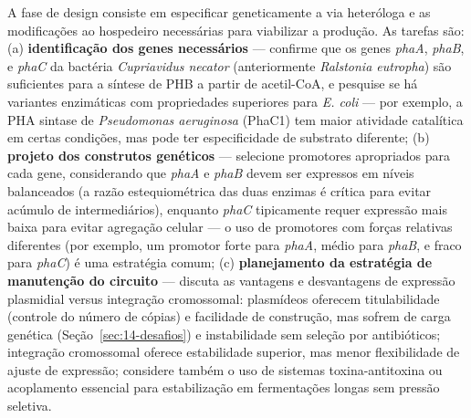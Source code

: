 \begin{exercicio}
A fase de design consiste em especificar geneticamente a via heteróloga e as modificações ao hospedeiro necessárias para viabilizar a produção. As tarefas são: (a) \textbf{identificação dos genes necessários} --- confirme que os genes \textit{phaA}, \textit{phaB}, e \textit{phaC} da bactéria \textit{Cupriavidus necator} (anteriormente \textit{Ralstonia eutropha}) são suficientes para a síntese de PHB a partir de acetil-CoA, e pesquise se há variantes enzimáticas com propriedades superiores para \textit{E. coli} --- por exemplo, a PHA sintase de \textit{Pseudomonas aeruginosa} (PhaC1) tem maior atividade catalítica em certas condições, mas pode ter especificidade de substrato diferente; (b) \textbf{projeto dos construtos genéticos} --- selecione promotores apropriados para cada gene, considerando que \textit{phaA} e \textit{phaB} devem ser expressos em níveis balanceados (a razão estequiométrica das duas enzimas é crítica para evitar acúmulo de intermediários), enquanto \textit{phaC} tipicamente requer expressão mais baixa para evitar agregação celular --- o uso de promotores com forças relativas diferentes (por exemplo, um promotor forte para \textit{phaA}, médio para \textit{phaB}, e fraco para \textit{phaC}) é uma estratégia comum; (c) \textbf{planejamento da estratégia de manutenção do circuito} --- discuta as vantagens e desvantagens de expressão plasmidial versus integração cromossomal: plasmídeos oferecem titulabilidade (controle do número de cópias) e facilidade de construção, mas sofrem de carga genética (Seção~\ref{sec:14-desafios}) e instabilidade sem seleção por antibióticos; integração cromossomal oferece estabilidade superior, mas menor flexibilidade de ajuste de expressão; considere também o uso de sistemas toxina-antitoxina ou acoplamento essencial para estabilização em fermentações longas sem pressão seletiva.
\end{exercicio}

